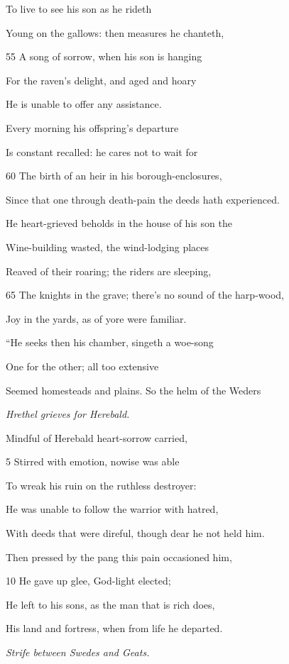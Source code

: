 To live to see his son as he rideth

Young on the gallows: then measures he chanteth,

55
A song of sorrow, when his son is hanging

For the raven’s delight, and aged and hoary

He is unable to offer any assistance.

Every morning his offspring’s departure

Is constant recalled: he cares not to wait for

60
The birth of an heir in his borough-enclosures,

Since that one through death-pain the deeds hath experienced.

He heart-grieved beholds in the house of his son the

Wine-building wasted, the wind-lodging places

Reaved of their roaring; the riders are sleeping,

65
The knights in the grave; there’s no sound of the harp-wood,

Joy in the yards, as of yore were familiar.



“He seeks then his chamber, singeth a woe-song

One for the other; all too extensive

Seemed homesteads and plains. So the helm of the Weders

\emph{Hrethel grieves
for Herebald.}

Mindful of Herebald heart-sorrow carried,

5
Stirred with emotion, nowise was able

To wreak his ruin on the ruthless destroyer:

He was unable to follow the warrior with hatred,

With deeds that were direful, though dear he not held him.

Then pressed by the pang this pain occasioned him,

10
He gave up glee, God-light elected;

He left to his sons, as the man that is rich does,

His land and fortress, when from life he departed.

\emph{Strife between
Swedes and Geats.}


